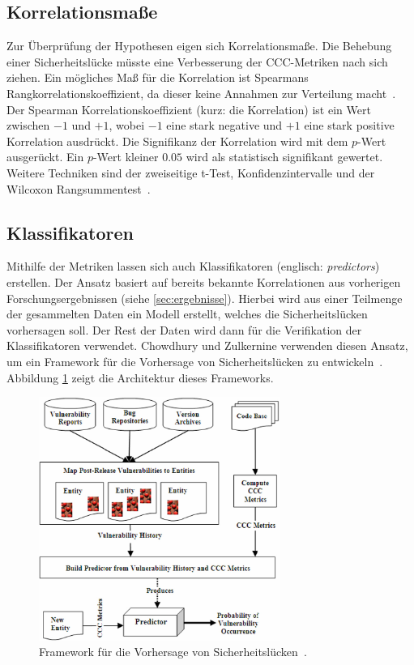 \subsection{Korrelationsmaße}
Zur Überprüfung der Hypothesen eigen sich Korrelationsmaße.
Die Behebung einer Sicherheitslücke müsste eine Verbesserung der CCC-Metriken nach sich ziehen.
Ein mögliches Maß für die Korrelation ist Spearmans Rangkorrelationskoeffizient, da dieser keine Annahmen zur Verteilung macht~\cite{alves_et_al,chowdhury_zulkernine_2010}.
Der Spearman Korrelationskoeffizient (kurz: die Korrelation) ist ein Wert zwischen $-1$ und $+1$, wobei $-1$ eine stark negative und $+1$ eine stark positive Korrelation ausdrückt.
Die Signifikanz der Korrelation wird mit dem $p$-Wert ausgerückt.
Ein $p$-Wert kleiner $0.05$ wird als statistisch signifikant gewertet.
Weitere Techniken sind der zweiseitige t-Test, Konfidenzintervalle und der Wilcoxon Rangsummentest~\cite{alves_et_al}.

\subsection{Klassifikatoren}
Mithilfe der Metriken lassen sich auch Klassifikatoren (englisch: \emph{predictors}) erstellen.
Der Ansatz basiert auf bereits bekannte Korrelationen aus vorherigen Forschungsergebnissen (siehe \ref{sec:ergebnisse}).
Hierbei wird aus einer Teilmenge der gesammelten Daten ein Modell erstellt, welches die Sicherheitslücken vorhersagen soll.
Der Rest der Daten wird dann für die Verifikation der Klassifikatoren verwendet.
Chowdhury und Zulkernine verwenden diesen Ansatz, um ein Framework für die Vorhersage von Sicherheitslücken zu entwickeln~\cite{chowdhury_zulkernine_2009}.
Abbildung \ref{fig:framework} zeigt die Architektur dieses Frameworks.
\begin{figure}
	\centering
	\includegraphics[width=0.7\textwidth]{img/framework.png}
	\caption{Framework für die Vorhersage von Sicherheitslücken~\cite{chowdhury_zulkernine_2009}.}
	\label{fig:framework}
\end{figure}

